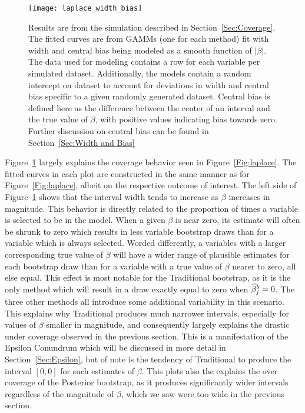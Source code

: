 \begin{figure}[hbtp]
  \texttt{[image: laplace\_width\_bias]}
  \caption{\label{Fig:laplace_width_bias} Results are from the simulation described in Section~\ref{Sec:Coverage}. The fitted curves are from GAMMs (one for each method) fit with width and central bias being modeled as a smooth function of $|\beta|$. The data used for modeling contains a row for each variable per simulated dataset. Additionally, the models contain a random intercept on dataset to account for deviations in width and central bias specific to a given randomly generated dataset. Central bias is defined here as the difference between the center of an interval and the true value of $\beta$, with positive values indicating bias towards zero. Further discussion on central bias can be found in Section~\ref{Sec:Width and Bias}}
\end{figure}

Figure~\ref{Fig:laplace_width_bias} largely explains the coverage behavior seen in Figure~\ref{Fig:laplace}. The fitted curves in each plot are constructed in the same manner as for Figure~\ref{Fig:laplace}, albeit on the respective outcome of interest. The left side of Figure~\ref{Fig:laplace_width_bias} shows that the interval width tends to increase as $\beta$ increases in magnitude. This behavior is directly related to the proportion of times a variable is selected to be in the model. When a given $\beta$ is near zero, its estimate will often be shrunk to zero which results in less variable bootstrap draws than for a variable which is always selected. Worded differently, a variables with a larger corresponding true value of $\beta$ will have a wider range of plausible estimates for each bootstrap draw than for a variable with a true value of $\beta$ nearer to zero, all else equal. This effect is most notable for the Traditional bootstrap, as it is the only method which will result in a draw exactly equal to zero when $\widehat{\beta}^b_j = 0$. The three other methods all introduce some additional variability in this scenario. This explains why Traditional produces much narrower intervals, especially for values of $\beta$ smaller in magnitude, and consequently largely explains the drastic under coverage observed in the previous section. This is a manifestation of the Epsilon Conundrum which will be discussed in more detail in Section~\ref{Sec:Epsilon}, but of note is the tendency of Traditional to produce the interval $[0,0]$ for such estimates of $\beta$. This plots also the explains the over coverage of the Posterior bootstrap, as it produces significantly wider intervals regardless of the magnitude of $\beta$, which we saw were too wide in the previous section.

